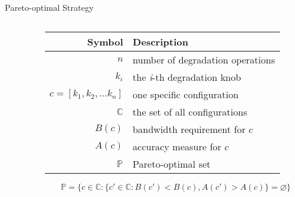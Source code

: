\begin{frame}{Pareto-optimal Strategy}
  \begin{columns}
    \begin{column}{0.39\textwidth}
      \centering

      \def\points{(0.95, 0.95), (0.93, 0.91), (0.90, 0.91), (0.80, 0.87),
        (0.70, 0.85), (0.64, 0.70), (0.5, 0.66), (0.4, 0.60)}

    \end{column}

    \pause

    \begin{column}{0.59\linewidth}
      \scriptsize
      \begin{table}
        \centering
        \begin{tabular}{r l}
          \toprule
          \textbf{Symbol} & \textbf{Description} \\
          \midrule
          $n$ & number of degradation operations \\
          $k_i$ & the \textit{i}-th degradation knob \\
          $c = [k_{1}, k_{2}, ... k_{n}]$ & one specific configuration \\
          $\mathbb{C}$ & the set of all configurations \\
          \midrule
          $B(c)$ & bandwidth requirement for $c$ \\
          $A(c)$ & accuracy measure for $c$ \\
          $\mathbb{P}$ & Pareto-optimal set \\
          \bottomrule
        \end{tabular}
      \end{table}

      \begin{equation*}
        \mathbb{P} = \{ c \in \mathbb{C} : \{ c' \in \mathbb{C}: B(c') < B(c),
        A(c') > A(c) \} = \varnothing\}
      \end{equation*}
    \end{column}
  \end{columns}
\end{frame}

